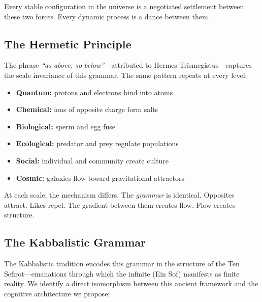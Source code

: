 \documentclass[11pt,a4paper]{article}
\begin{document}
Every stable configuration in the universe is a negotiated settlement between these two forces. Every dynamic process is a dance between them.

\subsection{The Hermetic Principle}

The phrase \emph{``as above, so below''}---attributed to Hermes Trismegistus---captures the scale invariance of this grammar. The same pattern repeats at every level:

\begin{itemize}
    \item \textbf{Quantum:} protons and electrons bind into atoms
    \item \textbf{Chemical:} ions of opposite charge form salts
    \item \textbf{Biological:} sperm and egg fuse
    \item \textbf{Ecological:} predator and prey regulate populations
    \item \textbf{Social:} individual and community create culture
    \item \textbf{Cosmic:} galaxies flow toward gravitational attractors
\end{itemize}

At each scale, the mechanism differs. The \emph{grammar} is identical. Opposites attract. Likes repel. The gradient between them creates flow. Flow creates structure.

\subsection{The Kabbalistic Grammar}

The Kabbalistic tradition encodes this grammar in the structure of the Ten Sefirot---emanations through which the infinite (Ein Sof) manifests as finite reality. We identify a direct isomorphism between this ancient framework and the cognitive architecture we propose:
\end{document}

